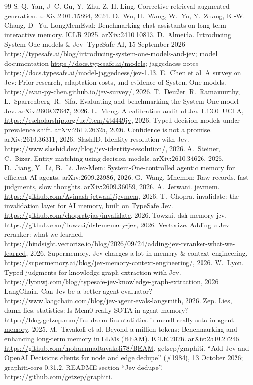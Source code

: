 \begin{thebibliography}{99}
 S.-Q. Yan, J.-C. Gu, Y.~Zhu, Z.-H. Ling. Corrective retrieval augmented generation. arXiv:2401.15884, 2024.
 D.~Wu, H.~Wang, W.~Yu, Y.~Zhang, K.-W. Chang, D.~Yu. LongMemEval: Benchmarking chat assistants on
long-term interactive memory. ICLR 2025. arXiv:2410.10813.
 D.~Almeida. Introducing System One models \& Jev. TypeSafe AI, 15 September 2026.
\url{https://typesafe.ai/blog/introducing-system-one-models-and-jev}; model documentation
\url{https://docs.typesafe.ai/models}; jaggedness notes \url{https://docs.typesafe.ai/model-jaggedness/jev-1.13}.
 E.~Chen et al. A survey on Jev: Prior research, adaptation costs, and evidence of System One models.
\url{https://evan-py-chen.github.io/jev-survey/}, 2026.
 T.~Deu\ss{}er, R.~Ramamurthy, L.~Sparrenberg, R.~Sifa. Evaluating and benchmarking the System One model
Jev. arXiv:2609.37647, 2026.
 L.~Meng. A calibration audit of Jev 1.13.0. UCLA, \url{https://escholarship.org/uc/item/4t4449jv}, 2026.
 Typed decision models under prevalence shift. arXiv:2610.26325, 2026.
 Confidence is not a promise. arXiv:2610.36311, 2026.
 SlashID. Identity resolution with Jev. \url{https://www.slashid.dev/blog/jev-identity-resolution/}, 2026.
 A.~Steiner, C.~Bizer. Entity matching using decision models. arXiv:2610.34626, 2026.
 D.~Jiang, Y.~Li, B.~Li. Jev-Mem: System-One-controlled agentic memory for efficient AI agents.
arXiv:2609.23986, 2026.
 G.~Wang. Mnemon: Raw records, fast judgments, slow thoughts. arXiv:2609.36059, 2026.
 A.~Jetwani. jevmem. \url{https://github.com/Avinash-jetwani/jevmem}, 2026.
 T.~Chopra. invalidate: the invalidation layer for AI memory, built on TypeSafe Jev.
\url{https://github.com/chopratejas/invalidate}, 2026.
 Towzai. dsh-memory-jev. \url{https://github.com/Towzai/dsh-memory-jev}, 2026.
 Vectorize. Adding a Jev reranker: what we learned.
\url{https://hindsight.vectorize.io/blog/2026/09/24/adding-jev-reranker-what-we-learned}, 2026.
 Supermemory. Jev changes a lot in memory \& context engineering.
\url{https://supermemory.ai/blog/jev-memory-context-engineering/}, 2026.
 W.~Lyon. Typed judgments for knowledge-graph extraction with Jev.
\url{https://lyonwj.com/blog/typesafe-jev-knowledge-graph-extraction}, 2026.
 LangChain. Can Jev be a better agent evaluator? \url{https://www.langchain.com/blog/jev-agent-evals-langsmith}, 2026.
 Zep. Lies, damn lies, statistics: Is Mem0 really SOTA in agent memory?
\url{https://blog.getzep.com/lies-damn-lies-statistics-is-mem0-really-sota-in-agent-memory}, 2025.
 M.~Tavakoli et al. Beyond a million tokens: Benchmarking and enhancing long-term memory in LLMs (BEAM).
ICLR 2026. arXiv:2510.27246. \url{https://github.com/mohammadtavakoli78/BEAM}.
 getzep/graphiti. ``Add Jev and OpenAI Decisions clients for node and edge dedupe'' (\#1984),
13 October 2026; graphiti-core 0.31.2, README section ``Jev dedupe''. \url{https://github.com/getzep/graphiti}.
\end{thebibliography}
